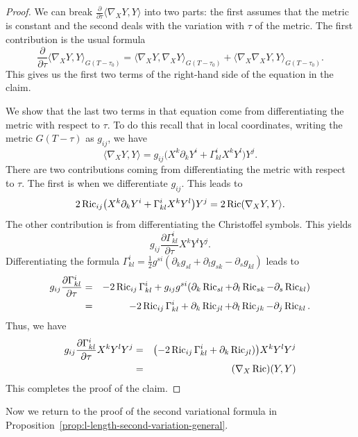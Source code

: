 \begin{proof}
\sketch
We can break $\frac{\partial}{\partial\tau}\langle \nabla_{X}Y,Y\rangle $ into
two parts: the first  assumes that the metric is constant and the second deals
with the variation with $\tau$ of the metric. The first contribution is the
usual formula
$$\frac{\partial}{\partial\tau}\langle \nabla_{X}Y,Y\rangle _{G(T-\tau_0)}=
\langle \nabla_{X}Y,\nabla_{X}Y\rangle _{G(T-\tau_0)}+ \langle
\nabla_{X}\nabla_{X}Y,Y\rangle _{G(T-\tau_0)}.$$ This gives us the first two
terms of the right-hand side of the equation in the claim.

We show that the last two terms in that equation come from differentiating the
metric with respect to $\tau$. To do this recall that in local coordinates,
writing the metric $G(T-\tau)$ as $g_{ij}$, we have
$$\langle \nabla_{X}Y,Y \rangle=g_{ij}\bigl(X^k\partial_k
Y^i+\Gamma_{kl}^iX^kY^l\bigr)Y^j.$$ There are two contributions coming from
differentiating the metric with respect to $\tau$. The first is when we
differentiate $g_{ij}$. This leads to
$$2\operatorname{Ric}_{ij}\bigl(X^k\partial_k
Y^i+\Gamma_{kl}^iX^kY^l\bigr)Y^j=2\operatorname{Ric}(\nabla_XY,Y\rangle.$$
The other contribution is from differentiating the Christoffel
symbols. This yields
$$g_{ij}\frac{\partial\Gamma^{i}_{kl}}{\partial \tau}X^{k}Y^{l}Y^{j}.$$
Differentiating the formula
$\Gamma_{kl}^i=\frac{1}{2}g^{si}(\partial_kg_{sl}+\partial_lg_{sk}-\partial_s
g_{kl})$ leads to \begin{eqnarray*} g_{ij}\frac{\partial
\Gamma_{kl}^i}{\partial \tau} & = & -2\operatorname{Ric}_{ij}\Gamma_{kl}^i+g_{ij}g^{si}(\partial_k\operatorname{Ric}_{sl}+\partial_l\operatorname{Ric}_{sk}
-\partial_s\operatorname{Ric}_{kl})\\
& = & -2\operatorname{Ric}_{ij}\Gamma_{kl}^i+
\partial_k\operatorname{Ric}_{jl}+\partial_l\operatorname{Ric}_{jk} -\partial_j\operatorname{Ric}_{kl}.
\end{eqnarray*}
Thus, we have
\begin{eqnarray*}
g_{ij}\frac{\partial\Gamma^{i}_{kl}}{\partial \tau}X^{k}Y^{l}Y^{j}
 & = & \bigl(-2\operatorname{Ric}_{ij}\Gamma^i_{kl}+\partial_k\operatorname{Ric}_{jl})\bigr)X^kY^lY^j \\
& = & (\nabla_X\operatorname{Ric})(Y,Y)
\end{eqnarray*}
This completes the proof of the claim.
\end{proof}








Now we return to the proof of the second variational formula in
Proposition~\ref{prop:l-length-second-variation-general}.


